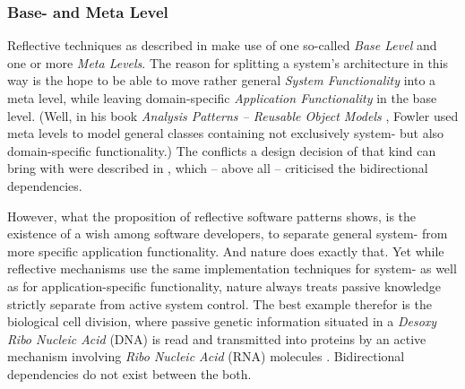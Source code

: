 %
%
%
%
%
%
%

\subsubsection{Base- and Meta Level}
\label{base_and_meta_level_heading}

Reflective techniques as described in \cite{heller2005} make use of one
so-called \emph{Base Level} and one or more \emph{Meta Levels}. The reason for
splitting a system's architecture in this way is the hope to be able to move
rather general \emph{System Functionality} into a meta level, while leaving
domain-specific \emph{Application Functionality} in the base level. (Well, in
his book \emph{Analysis Patterns -- Reusable Object Models} \cite{fowler1997},
Fowler used meta levels to model general classes containing not exclusively
system- but also domain-specific functionality.) The conflicts a design
decision of that kind can bring with were described in \cite{heller2005}, which
-- above all -- criticised the bidirectional dependencies.

However, what the proposition of reflective software patterns shows, is the
existence of a wish among software developers, to separate general system- from
more specific application functionality. And nature does exactly that. Yet
while reflective mechanisms use the same implementation techniques for system-
as well as for application-specific functionality, nature always treats passive
knowledge strictly separate from active system control. The best example
therefor is the biological cell division, where passive genetic information
situated in a \emph{Desoxy Ribo Nucleic Acid} (DNA) is read and transmitted
into proteins by an active mechanism involving \emph{Ribo Nucleic Acid} (RNA)
molecules \cite{heller2004}. Bidirectional dependencies do not exist between
the both.
